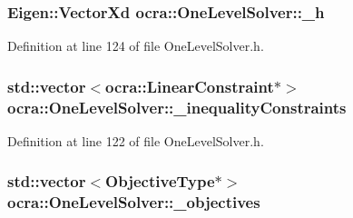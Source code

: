 \subsubsection[{\texorpdfstring{\+\_\+h}{_h}}]{\setlength{\rightskip}{0pt plus 5cm}Eigen\+::\+Vector\+Xd ocra\+::\+One\+Level\+Solver\+::\+\_\+h\hspace{0.3cm}{\ttfamily [protected]}}\hypertarget{classocra_1_1OneLevelSolver_a8d4cbb48bc63b7b1b3f11603516ef120}{}\label{classocra_1_1OneLevelSolver_a8d4cbb48bc63b7b1b3f11603516ef120}


Definition at line 124 of file One\+Level\+Solver.\+h.

\subsubsection[{\texorpdfstring{\+\_\+inequality\+Constraints}{_inequalityConstraints}}]{\setlength{\rightskip}{0pt plus 5cm}std\+::vector$<${\bf ocra\+::\+Linear\+Constraint}$\ast$$>$ ocra\+::\+One\+Level\+Solver\+::\+\_\+inequality\+Constraints\hspace{0.3cm}{\ttfamily [protected]}}\hypertarget{classocra_1_1OneLevelSolver_a87161154a54c64ac44ec3a9cb2d9a6ec}{}\label{classocra_1_1OneLevelSolver_a87161154a54c64ac44ec3a9cb2d9a6ec}


Definition at line 122 of file One\+Level\+Solver.\+h.

\subsubsection[{\texorpdfstring{\+\_\+objectives}{_objectives}}]{\setlength{\rightskip}{0pt plus 5cm}std\+::vector$<${\bf Objective\+Type}$\ast$$>$ ocra\+::\+One\+Level\+Solver\+::\+\_\+objectives\hspace{0.3cm}{\ttfamily [protected]}}\hypertarget{classocra_1_1OneLevelSolver_aa1b1b5c203c50e16fc9c8ff8256d8d6c}{}\label{classocra_1_1OneLevelSolver_aa1b1b5c203c50e16fc9c8ff8256d8d6c}


